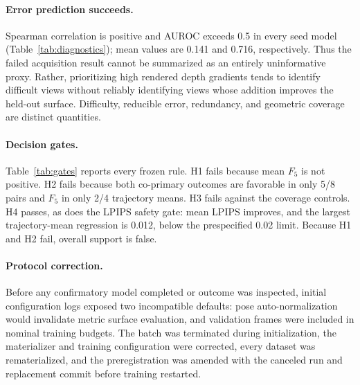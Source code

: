 \begin{table}[t]
  \centering
  \caption{Post-hoc error-ranking diagnostics for the target-free
  depth-gradient proxy.  Error targets are used only for evaluation.  AUSE is
  area under the sparsification-error curve.}
  \label{tab:diagnostics}
  
\end{table}

\paragraph{Error prediction succeeds.}
Spearman correlation is positive and AUROC exceeds 0.5 in every seed model
(Table~\ref{tab:diagnostics}); mean values are 0.141 and 0.716, respectively.
Thus the failed acquisition result cannot be summarized as an entirely
uninformative proxy.  Rather, prioritizing high rendered depth gradients tends
to identify difficult views without reliably identifying views whose addition
improves the held-out surface.  Difficulty, reducible error, redundancy, and
geometric coverage are distinct quantities.

\begin{table}[t]
  \centering
  \caption{Prespecified decisions.}
  \label{tab:gates}
  
\end{table}

\paragraph{Decision gates.}
Table~\ref{tab:gates} reports every frozen rule.  H1 fails because mean $F_5$
is not positive.  H2 fails because both co-primary outcomes are favorable in
only 5/8 pairs and $F_5$ in only 2/4 trajectory means.  H3 fails against the
coverage controls.  H4 passes, as does the LPIPS safety gate: mean LPIPS
improves, and the largest trajectory-mean regression is 0.012, below the
prespecified 0.02 limit.  Because H1 and H2 fail, overall support is false.

\paragraph{Protocol correction.}
Before any confirmatory model completed or outcome was inspected, initial
configuration logs exposed two incompatible defaults: pose auto-normalization
would invalidate metric surface evaluation, and validation frames were included
in nominal training budgets.  The batch was terminated during initialization,
the materializer and training configuration were corrected, every dataset was
rematerialized, and the preregistration was amended with the canceled run and
replacement commit before training restarted.
